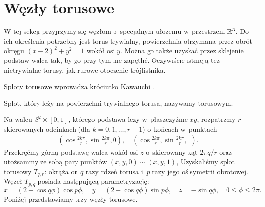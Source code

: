 
\section{Węzły torusowe}
%

W tej sekcji przyjrzymy się węzłom o~specjalnym ułożeniu w~przestrzeni $\mathbb R^3$.
Do ich określenia potrzebny jest torus trywialny, powierzchnia otrzymana przez obrót okręgu $(x-2)^2 + y^2 = 1$ wokół osi $y$.
Można go także uzyskać przez sklejenie podstaw walca tak, by go przy tym nie zapętlić.
Oczywiście istnieją też nietrywialne torusy, jak rurowe otoczenie trójlistnika.

Sploty torusowe wprowadza króciutko Kawauchi \cite[s. 26-27]{kawauchi96}.

\begin{definition}
    Splot, który leży na powierzchni trywialnego torusa, nazywamy torusowym.
\end{definition}

Na walcu $S^2 \times [0,1]$, którego podstawa leży w~płaszczyźnie $xy$, rozpatrzmy $r$ skierowanych odcinkach (dla $k = 0, 1, \ldots, r - 1$) o~końcach w~punktach
\begin{align*}
    \left(\cos \frac{2k \pi}{r}, \sin \frac{2k\pi}{r}, 0 \right), \quad
    \left(\cos \frac{2k \pi}{r}, \sin \frac{2k\pi}{r}, 1 \right).
\end{align*}
Przekręćmy górną podstawę walca wokół osi $z$ o~skierowany kąt $2\pi q / r$ oraz utożsammy ze sobą pary punktów $(x, y, 0) \sim (x, y, 1)$,
Uzyskaliśmy splot torusowy $T_{q, r}$: okrąża on $q$ razy rdzeń torusa i~$p$ razy jego oś symetrii obrotowej.
Węzeł $T_{p, q}$ posiada następującą parametryzację:
\[
    x = (2+\cos q \phi) \cos p \phi, \quad
    y = (2+\cos q \phi) \sin p \phi, \quad
    z = - \sin q \phi, \quad
    0 \le \phi \le 2\pi.
\]
Poniżej przedstawiamy trzy węzły torusowe.

